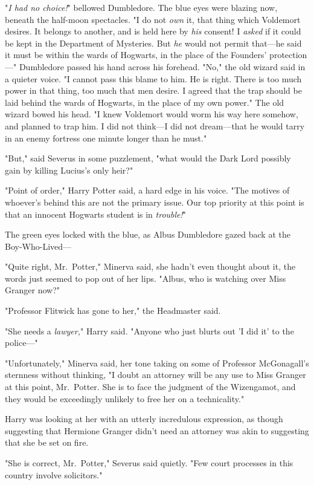 "\emph{I had no choice!}" bellowed Dumbledore. The blue eyes were blazing now, 
beneath the half-moon spectacles. "I do not \emph{own} it, that thing which 
Voldemort desires. It belongs to another, and is held here by \emph{his} 
consent! I \emph{asked} if it could be kept in the Department of Mysteries. But 
\emph{he} would not permit that---he said it must be within the wards of 
Hogwarts, in the place of the Founders' protection---" Dumbledore passed his 
hand across his forehead. "No," the old wizard said in a quieter voice. "I 
cannot pass this blame to him. He is right. There is too much power in that 
thing, too much that men desire. I agreed that the trap should be laid behind 
the wards of Hogwarts, in the place of my own power." The old wizard bowed his 
head. "I knew Voldemort would worm his way here somehow, and planned to trap 
him. I did not think---I did not dream---that he would tarry in an enemy 
fortress one minute longer than he must."

"But," said Severus in some puzzlement, "what would the Dark Lord possibly gain 
by killing Lucius's only heir?"

"Point of order," Harry Potter said, a hard edge in his voice. "The motives of 
whoever's behind this are not the primary issue. Our top priority at this point 
is that an innocent Hogwarts student is in \emph{trouble!}"

The green eyes locked with the blue, as Albus Dumbledore gazed back at the 
Boy-Who-Lived---

"Quite right, Mr.~Potter," Minerva said, she hadn't even thought about it, the 
words just seemed to pop out of her lips. "Albus, who is watching over Miss 
Granger now?"

"Professor Flitwick has gone to her," the Headmaster said.

"She needs a \emph{lawyer,}" Harry said. "Anyone who just blurts out 'I did it' 
to the police---"

"Unfortunately," Minerva said, her tone taking on some of Professor 
McGonagall's sternness without thinking, "I doubt an attorney will be any use 
to Miss Granger at this point, Mr.~Potter. She is to face the judgment of the 
Wizengamot, and they would be exceedingly unlikely to free her on a 
technicality."

Harry was looking at her with an utterly incredulous expression, as though 
suggesting that Hermione Granger didn't need an attorney was akin to suggesting 
that she be set on fire.

"She is correct, Mr.~Potter," Severus said quietly. "Few court processes in 
this country involve solicitors."


